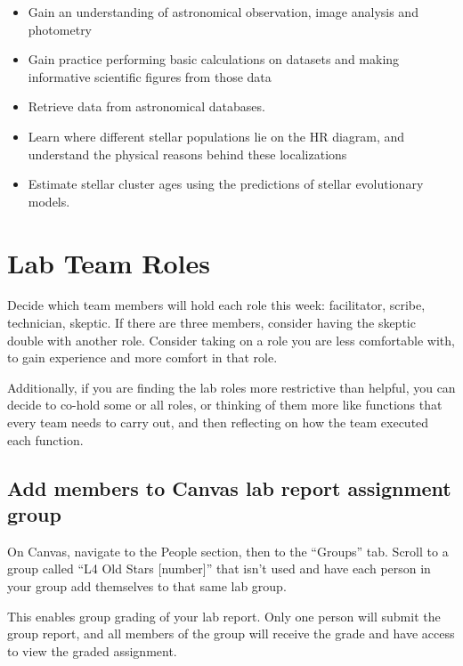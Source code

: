 \begin{itemize}
    \item Gain an understanding of astronomical observation, image analysis and photometry
	\item Gain practice performing basic calculations on datasets and making informative scientific figures from those data
	\item Retrieve data from astronomical databases.
	\item Learn where different stellar populations lie on the HR diagram, and understand the physical reasons behind these localizations
	\item Estimate stellar cluster ages using the predictions of stellar evolutionary models. 
\end{itemize}


\section{Lab Team Roles}

Decide which team members will hold each role this week: facilitator, scribe, technician, skeptic. If there are three members, consider having the skeptic double with another role. Consider taking on a role you are less comfortable with, to gain experience and more comfort in that role.

Additionally, if you are finding the lab roles more restrictive than helpful, you can decide to co-hold some or all roles, or thinking of them more like functions that every team needs to carry out, and then reflecting on how the team executed each function.

\subsection{Add members to Canvas lab report assignment group}

\begin{steps}
	\item On Canvas, navigate to the People section, then to the ``Groups'' tab. Scroll to a group called ``L4 Old Stars [number]'' that isn't used and have each person in your group add themselves to that same lab group.
\end{steps}

This enables group grading of your lab report. Only one person will submit the group report, and all members of the group will receive the grade and have access to view the graded assignment.

